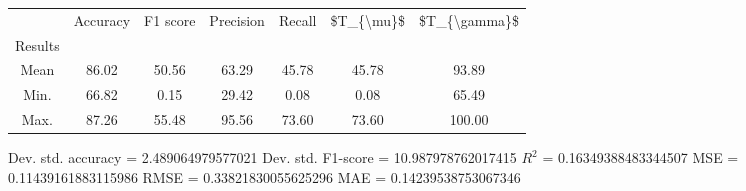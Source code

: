 \begin{tabular}{|c|c|c|c|c|c|c|}
\toprule
{} &  Accuracy &  F1 score &  Precision &  Recall &  \$T\_\{\textbackslash mu\}\$ &  \$T\_\{\textbackslash gamma\}\$ \\
Results &           &           &            &         &            &               \\
\hline
Mean    &     86.02 &     50.56 &      63.29 &   45.78 &      45.78 &         93.89 \\
Min.    &     66.82 &      0.15 &      29.42 &    0.08 &       0.08 &         65.49 \\
Max.    &     87.26 &     55.48 &      95.56 &   73.60 &      73.60 &        100.00 \\
\bottomrule
\end{tabular}

 Dev. std. accuracy = 2.489064979577021
 Dev. std. F1-score = 10.987978762017415
 $R^2$ = 0.16349388483344507
 MSE = 0.11439161883115986
 RMSE = 0.33821830055625296
 MAE = 0.14239538753067346